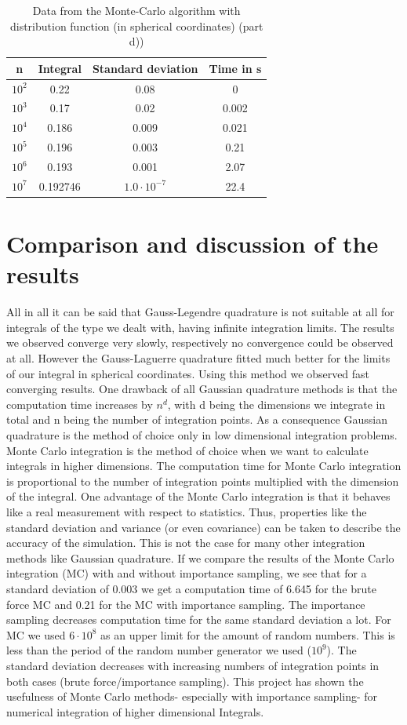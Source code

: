 \documentclass[10pt,a4paper]{article}
\begin{document}
\begin{table}[h]
\centering
\caption{Data from the Monte-Carlo algorithm with distribution function (in spherical coordinates) (part d))}
\label{Data from the  montecarlo algorithm (part d))}
\begin{tabular}{c|c|c|c}
n & Integral & Standard deviation & Time in s \\
\hline\hline
$10^2$ & 0.22 & 0.08 & 0 \\
$10^3$ & 0.17 & 0.02 & 0.002 \\
$10^4$ & 0.186 & 0.009 & 0.021 \\
$10^5$ & 0.196 & 0.003 & 0.21 \\
$10^6$ & 0.193 & 0.001 & 2.07 \\
$10^7$ & 0.192746 & $1.0 \cdot 10^{-7}$ & 22.4
\end{tabular}
\end{table}

\section{Comparison and discussion of the results}

All in all it can be said that Gauss-Legendre quadrature is not suitable at all for integrals of the type we dealt with, having infinite integration limits. The results we observed converge very slowly, respectively no convergence could be observed at all. However the Gauss-Laguerre quadrature fitted much better for the limits of our integral in spherical coordinates. Using this method we observed fast converging results. One drawback of all Gaussian quadrature methods is that the computation time increases by $n^d$, with d being the dimensions we integrate in total and n being the number of integration points. As a consequence Gaussian quadrature is the method of choice only in low dimensional integration problems.
Monte Carlo integration is the method of choice when we want to calculate integrals in higher dimensions. The computation time for Monte Carlo integration is proportional to the number of integration points multiplied with the dimension of the integral. One advantage of the Monte Carlo integration is that it behaves like a real measurement with respect to statistics. Thus, properties like the standard deviation and variance (or even covariance) can be taken to describe the accuracy of the simulation. This is not the case for many other integration methods like Gaussian quadrature. If we compare the results of the Monte Carlo integration (MC) with and without importance sampling, we see that for a standard deviation of 0.003 we get a computation time of 6.645 for the brute force MC and 0.21 for the MC with importance sampling. The importance sampling decreases computation time for the same standard deviation a lot. For MC we used $6 \cdot 10^{8}$ as an upper limit for the amount of random numbers. This is less than the period of the random number generator we used ($10^{9}$). The standard deviation decreases with increasing numbers of integration points in both cases (brute force/importance sampling). This project has shown the usefulness of Monte Carlo methods- especially with importance sampling- for numerical integration of higher dimensional Integrals. 
\end{document}
